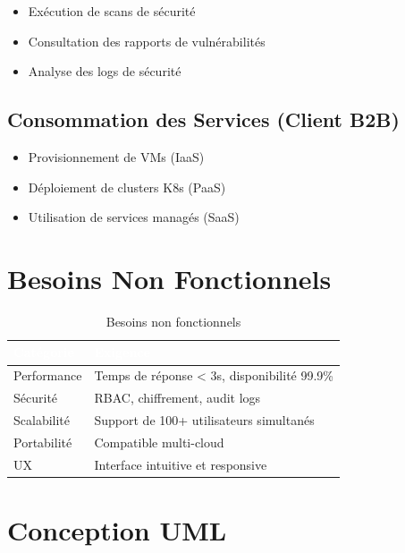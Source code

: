 \documentclass[12pt,a4paper,twoside]{report}
\begin{document}
\begin{itemize}
    \item Exécution de scans de sécurité
    \item Consultation des rapports de vulnérabilités
    \item Analyse des logs de sécurité
\end{itemize}

\subsection{Consommation des Services (Client B2B)}

\begin{itemize}
    \item Provisionnement de VMs (IaaS)
    \item Déploiement de clusters K8s (PaaS)
    \item Utilisation de services managés (SaaS)
\end{itemize}

\section{Besoins Non Fonctionnels}

\begin{table}[H]
    \centering
    \caption{Besoins non fonctionnels}
    \label{tab:besoins-nf}
    \begin{tabular}{|l|p{9cm}|}
        \hline
        \rowcolor{orange!80}
        \textcolor{white}{\textbf{Catégorie}} & \textcolor{white}{\textbf{Exigence}} \\
        \hline
        Performance & Temps de réponse < 3s, disponibilité 99.9\% \\
        Sécurité & RBAC, chiffrement, audit logs \\
        Scalabilité & Support de 100+ utilisateurs simultanés \\
        Portabilité & Compatible multi-cloud \\
        UX & Interface intuitive et responsive \\
        \hline
    \end{tabular}
\end{table}

\section{Conception UML}
\end{document}
